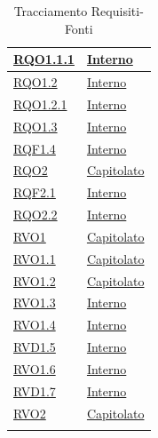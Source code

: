 \begin{itemize}
\begin{itemize}
\begin{itemize}
\begin{itemize}
\begin{longtable}{|>{\centering}m{5cm}|m{5cm}<{\centering}|}
\hyperlink{RQO1.1.1}{RQO1.1.1} & \hyperlink{Interno}{Interno}\\ \hline

\hyperlink{RQO1.2}{RQO1.2} & \hyperlink{Interno}{Interno}\\ \hline

\hyperlink{RQO1.2.1}{RQO1.2.1} & \hyperlink{Interno}{Interno}\\ \hline

\hyperlink{RQO1.3}{RQO1.3} & \hyperlink{Interno}{Interno}\\ \hline

\hyperlink{RQF1.4}{RQF1.4} & \hyperlink{Interno}{Interno}\\ \hline

\hyperlink{RQO2}{RQO2} & \hyperlink{Capitolato}{Capitolato}\\ \hline

\hyperlink{RQF2.1}{RQF2.1} & \hyperlink{Interno}{Interno}\\ \hline

\hyperlink{RQO2.2}{RQO2.2} & \hyperlink{Interno}{Interno}\\ \hline

\hyperlink{RVO1}{RVO1} & \hyperlink{Capitolato}{Capitolato}\\ \hline

\hyperlink{RVO1.1}{RVO1.1} & \hyperlink{Capitolato}{Capitolato}\\ \hline

\hyperlink{RVO1.2}{RVO1.2} & \hyperlink{Capitolato}{Capitolato}\\ \hline

\hyperlink{RVO1.3}{RVO1.3} & \hyperlink{Interno}{Interno}\\ \hline

\hyperlink{RVO1.4}{RVO1.4} & \hyperlink{Interno}{Interno}\\ \hline

\hyperlink{RVD1.5}{RVD1.5} & \hyperlink{Interno}{Interno}\\ \hline

\hyperlink{RVO1.6}{RVO1.6} & \hyperlink{Interno}{Interno}\\ \hline

\hyperlink{RVD1.7}{RVD1.7} & \hyperlink{Interno}{Interno}\\ \hline

\hyperlink{RVO2}{RVO2} & \hyperlink{Capitolato}{Capitolato}\\ \hline

\caption[Tracciamento Requisiti-Fonti]{Tracciamento Requisiti-Fonti}
\label{tabella:requi-fonti}
\end{longtable}
\clearpage


\end{itemize}
\end{itemize}
\end{itemize}
\end{itemize}
